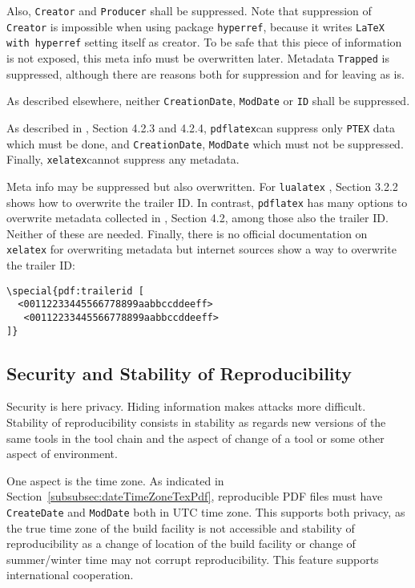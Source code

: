 \documentclass[a4paper, english]{article}%
\newcommand{\pdflatex}{\texttt{pdflatex}}
\newcommand{\lualatex}{\texttt{lualatex}}
\newcommand{\xelatex}{\texttt{xelatex}}
\begin{document}
Also, \texttt{Creator} and \texttt{Producer} shall be suppressed. 
Note that suppression of \texttt{Creator} is impossible when using package \texttt{hyperref}, 
because it writes \texttt{LaTeX with hyperref} setting itself as creator. 
To be safe that this piece of information is not exposed, 
this meta info must be overwritten later. 
Metadata \texttt{Trapped} is suppressed, although there are reasons 
both for suppression and for leaving as is. 

As described elsewhere, neither \texttt{CreationDate}, \texttt{ModDate} or \texttt{ID} shall be suppressed. 

As described in \cite{PdfTexUsr24}, Section 4.2.3 and 4.2.4, \pdflatex can suppress only \texttt{PTEX} data 
which must be done, and \texttt{CreationDate}, \texttt{ModDate} which must not be suppressed. 
Finally, \xelatex cannot suppress any metadata. 
\medskip 


Meta info may be suppressed but also overwritten. 
For \lualatex{} \cite{LuaTexRef24}, Section 3.2.2 shows how to overwrite the trailer ID. 
In contrast, \pdflatex{} has many options to overwrite metadata 
collected in \cite{PdfTexUsr24}, Section 4.2, among those also the trailer ID. 
Neither of these are needed. 
Finally, there is no official documentation on \xelatex{} for overwriting metadata 
but internet sources show a way to overwrite the trailer ID: 
%
\begin{verbatim}
\special{pdf:trailerid [
  <00112233445566778899aabbccddeeff>
   <00112233445566778899aabbccddeeff>
]}
\end{verbatim}



\subsection{Security and Stability of Reproducibility}\label{subsec:securityRep}






Security is here privacy. 
Hiding information makes attacks more difficult. 
Stability of reproducibility consists in stability as regards new versions of the same tools 
in the tool chain and the aspect of change of a tool or some other aspect of environment. 

One aspect is the time zone. 
As indicated in Section~\ref{subsubsec:dateTimeZoneTexPdf}, 
reproducible PDF files must have \texttt{CreateDate} and \texttt{ModDate} 
both in UTC time zone. 
This supports both privacy, as the true time zone of the build facility is not accessible 
and stability of reproducibility as a change of location of the build facility 
or change of summer/winter time 
may not corrupt reproducibility. 
This feature supports international cooperation. 
\end{document}
